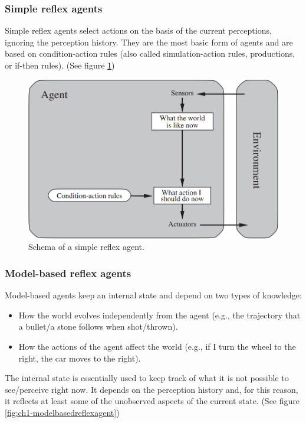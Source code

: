 \subsubsection{Simple reflex agents}
Simple reflex agents select actions on the basis of the current perceptions, ignoring the perception history. They are the most basic form of agents and are based on condition-action rules (also called simulation-action rules, productions, or if-then rules). (See figure \ref{fig:ch1-simplereflexagent})

\begin{figure}[hbt]
    \centering
    \includegraphics[scale=0.35]{Images/Chapter 1/simple-reflex-agents.png}
    \caption{Schema of a simple reflex agent.}
    \label{fig:ch1-simplereflexagent}
\end{figure}

\subsubsection{Model-based reflex agents}
Model-based agents keep an internal state and depend on two types of knowledge:
\begin{itemize}
    \item How the world evolves independently from the agent (e.g., the trajectory that a bullet/a stone follows when shot/thrown).
    \item How the actions of the agent affect the world (e.g., if I turn the wheel to the right, the car moves to the right).
\end{itemize}
The internal state is essentially used to keep track of what it is not possible to see/perceive right now. It depends on the perception history and, for this reason, it reflects at least some of the unobserved aspects of the current state. (See figure \ref{fig:ch1-modelbasedreflexagent})

